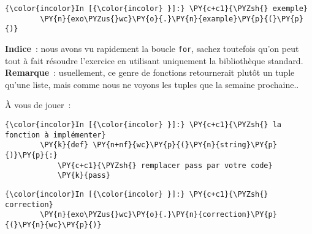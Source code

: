     \begin{Verbatim}[commandchars=\\\{\}]
{\color{incolor}In [{\color{incolor} }]:} \PY{c+c1}{\PYZsh{} exemple}
        \PY{n}{exo\PYZus{}wc}\PY{o}{.}\PY{n}{example}\PY{p}{(}\PY{p}{)}
\end{Verbatim}


    \textbf{Indice}~: nous avons vu rapidement la boucle \texttt{for},
sachez toutefois qu'on peut tout à fait résoudre l'exercice en utilisant
uniquement la bibliothèque standard.\\

\textbf{Remarque}~: usuellement, ce genre de fonctions retournerait
plutôt un tuple qu'une liste, mais comme nous ne voyons les tuples que
la semaine prochaine..

    À vous de jouer~:

    \begin{Verbatim}[commandchars=\\\{\}]
{\color{incolor}In [{\color{incolor} }]:} \PY{c+c1}{\PYZsh{} la fonction à implémenter}
        \PY{k}{def} \PY{n+nf}{wc}\PY{p}{(}\PY{n}{string}\PY{p}{)}\PY{p}{:}
            \PY{c+c1}{\PYZsh{} remplacer pass par votre code}
            \PY{k}{pass}
\end{Verbatim}


    \begin{Verbatim}[commandchars=\\\{\}]
{\color{incolor}In [{\color{incolor} }]:} \PY{c+c1}{\PYZsh{} correction}
        \PY{n}{exo\PYZus{}wc}\PY{o}{.}\PY{n}{correction}\PY{p}{(}\PY{n}{wc}\PY{p}{)}
\end{Verbatim}